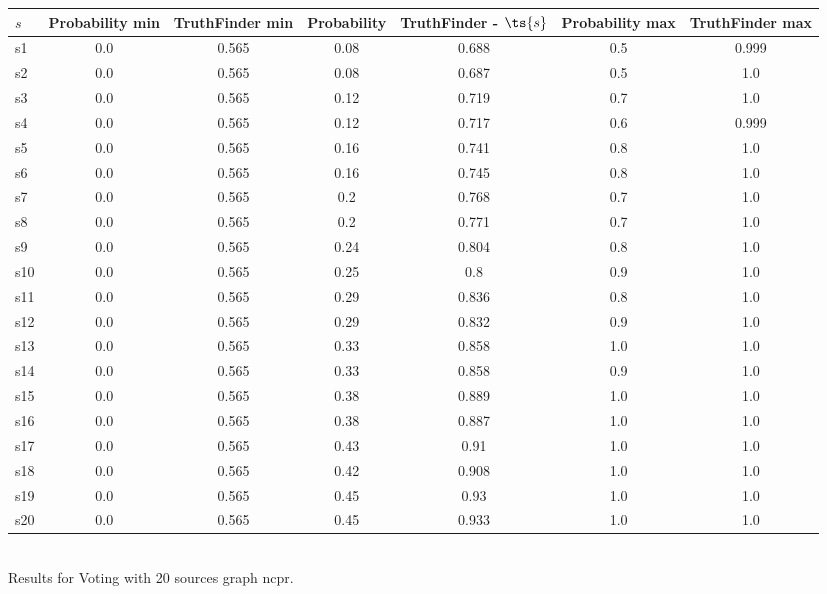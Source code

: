 \documentclass{article}
\begin{document}
\noindent\begin{tabular}{|l|c|c|c|c|c|c|}
\hline
$s$& Probability min & TruthFinder min & Probability & TruthFinder - $\ts{s}$ & Probability max & TruthFinder max\\
\hline
s1 &0.0 & 0.565 & 0.08 & 0.688 & 0.5 & 0.999\\
\hline
s2 &0.0 & 0.565 & 0.08 & 0.687 & 0.5 & 1.0\\
\hline
s3 &0.0 & 0.565 & 0.12 & 0.719 & 0.7 & 1.0\\
\hline
s4 &0.0 & 0.565 & 0.12 & 0.717 & 0.6 & 0.999\\
\hline
s5 &0.0 & 0.565 & 0.16 & 0.741 & 0.8 & 1.0\\
\hline
s6 &0.0 & 0.565 & 0.16 & 0.745 & 0.8 & 1.0\\
\hline
s7 &0.0 & 0.565 & 0.2 & 0.768 & 0.7 & 1.0\\
\hline
s8 &0.0 & 0.565 & 0.2 & 0.771 & 0.7 & 1.0\\
\hline
s9 &0.0 & 0.565 & 0.24 & 0.804 & 0.8 & 1.0\\
\hline
s10 &0.0 & 0.565 & 0.25 & 0.8 & 0.9 & 1.0\\
\hline
s11 &0.0 & 0.565 & 0.29 & 0.836 & 0.8 & 1.0\\
\hline
s12 &0.0 & 0.565 & 0.29 & 0.832 & 0.9 & 1.0\\
\hline
s13 &0.0 & 0.565 & 0.33 & 0.858 & 1.0 & 1.0\\
\hline
s14 &0.0 & 0.565 & 0.33 & 0.858 & 0.9 & 1.0\\
\hline
s15 &0.0 & 0.565 & 0.38 & 0.889 & 1.0 & 1.0\\
\hline
s16 &0.0 & 0.565 & 0.38 & 0.887 & 1.0 & 1.0\\
\hline
s17 &0.0 & 0.565 & 0.43 & 0.91 & 1.0 & 1.0\\
\hline
s18 &0.0 & 0.565 & 0.42 & 0.908 & 1.0 & 1.0\\
\hline
s19 &0.0 & 0.565 & 0.45 & 0.93 & 1.0 & 1.0\\
\hline
s20 &0.0 & 0.565 & 0.45 & 0.933 & 1.0 & 1.0\\
\hline
\end{tabular}\\

\noindent Results for Voting with 20 sources graph ncpr.
\end{document}
